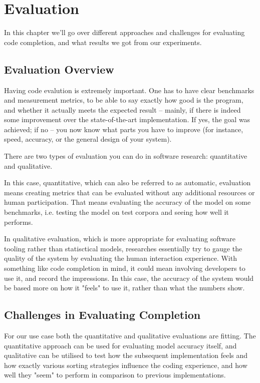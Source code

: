\chapter{Evaluation}
\label{chap:Evaluation}

In this chapter we'll go over different approaches and challenges for evaluating code completion, and what results we got from our experiments.

\section{Evaluation Overview}
Having code evalution is extremely important. One has to have clear benchmarks and measurement metrics, to be able to say exactly how good is the program, and whether it actually meets the expected result -- mainly, if there is indeed some improvement over the state-of-the-art implementation. If yes, the goal was achieved; if no -- you now know what parts you have to improve (for instance, speed, accuracy, or the general design of your system).

There are two types of evaluation you can do in software research: quantitative and qualitative.

In this case, quantitative, which can also be referred to as automatic, evaluation means creating metrics that can be evaluated without any additional resources or human participation. That means evaluating the accuracy of the model on some benchmarks, i.e. testing the model on test corpora and seeing how well it performs.

In qualitative evaluation, which is more appropriate for evaluating software tooling rather than statisctical models, researches essentially try to gauge the quality of the system by evaluating the human interaction experience. With something like code completion in mind, it could mean involving developers to use it, and record the impressions. In this case, the accuracy of the system would be based more on how it "feels" to use it, rather than what the numbers show.

\section{Challenges in Evaluating Completion}
For our use case both the quantitative and qualitative evaluations are fitting. The quantitative approach can be used for evaluating model accuracy itself, and qualitative can be utilised to test how the subsequent implementation feels and how exactly various sorting strategies influence the coding experience, and how well they "seem" to perform in comparison to previous implementations.

